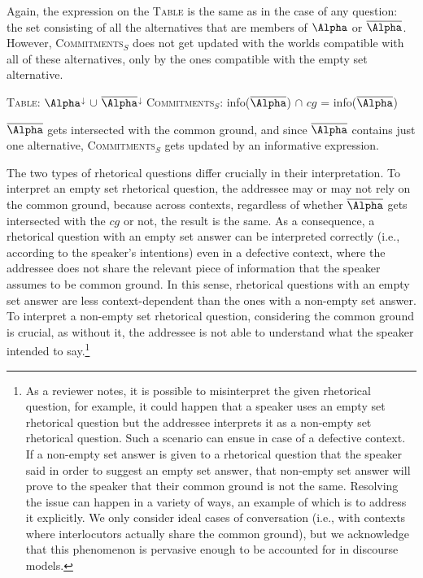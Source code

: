 \documentclass[output=paper,colorlinks,citecolor=brown            ,chinesefont]{langscibook}
\begin{document}
Again, the expression on the \textsc{Table} is the same as in the case of any question: the set consisting of all the alternatives that are members of $\Alpha$ or $\overline{\Alpha}$. However, \textsc{Commitments}$_S$ does not get updated with the worlds compatible with all of these alternatives, only by the ones compatible with the empty set alternative. 

\begin{exe}
\ex\label{excont} 
\begin{xlist}
\ex\label{excont1} \textsc{Table}: $\Alpha$$^\downarrow$ $\cup$ $\overline{\Alpha}$$^\downarrow$
\ex\label{excont2} \textsc{Commitments}$_S$: info($\overline \Alpha$) $\cap$ $cg$ =  info($\overline{\Alpha}$) 
\end{xlist}
\end{exe}

$\overline{\Alpha}$ gets intersected with the common ground, and since $\overline{\Alpha}$ contains just one alternative,  \textsc{Commitments}$_S$ gets updated by an informative expression. 

The two types of rhetorical questions differ crucially in their interpretation. To interpret an empty set rhetorical question, the addressee may or may not rely on the common ground, because across contexts, regardless of whether $\overline{\Alpha}$ gets intersected with the $cg$ or not, the result is the same. As a consequence, a rhetorical question with an empty set answer can be interpreted correctly (i.e., according to the speaker's intentions) even in a defective context, where the addressee does not share the relevant piece of information that the speaker assumes to be common ground. In this sense, rhetorical questions with an empty set answer are less context-dependent than the ones with a non-empty set answer. To interpret a non-empty set rhetorical question, considering the common ground is crucial, as without it, the addressee is not able to understand what the speaker intended to say.\footnote{As a reviewer notes, it is possible to misinterpret the given rhetorical question, for example, it could happen that a speaker uses an empty set rhetorical question but the addressee interprets it as a non-empty set rhetorical question. Such a scenario can ensue in case of a defective context. If a non-empty set answer is given to a rhetorical question that the speaker said in order to suggest an empty set answer, that non-empty set answer will prove to the speaker that their common ground is not the same. Resolving the issue can happen in a variety of ways, an example of which is to address it explicitly. We only consider ideal cases of conversation (i.e., with contexts where interlocutors actually share the common ground), but we acknowledge that this phenomenon is pervasive enough to be accounted for in discourse models.}
\end{document}
